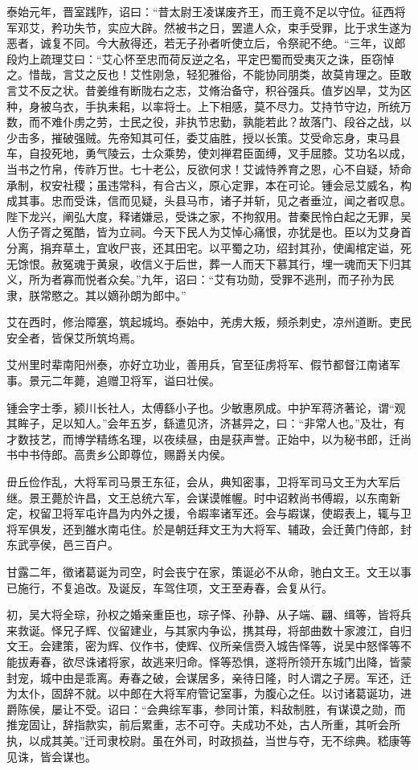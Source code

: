 \documentclass[12pt,UTF8]{ctexbook}
\begin{document}
泰始元年，晋室践阼，诏曰：“昔太尉王凌谋废齐王，而王竟不足以守位。征西将军邓艾，矜功失节，实应大辟。然被书之日，罢遣人众，束手受罪，比于求生遂为恶者，诚复不同。今大赦得还，若无子孙者听使立后，令祭祀不绝。“三年，议郎段灼上疏理艾曰：“艾心怀至忠而荷反逆之名，平定巴蜀而受夷灭之诛，臣窃悼之。惜哉，言艾之反也！艾性刚急，轻犯雅俗，不能协同朋类，故莫肯理之。臣敢言艾不反之状。昔姜维有断陇右之志，艾脩治备守，积谷强兵。值岁凶旱，艾为区种，身被乌衣，手执耒耜，以率将士。上下相感，莫不尽力。艾持节守边，所统万数，而不难仆虏之劳，士民之役，非执节忠勤，孰能若此？故落门、段谷之战，以少击多，摧破强贼。先帝知其可任，委艾庙胜，授以长策。艾受命忘身，束马县车，自投死地，勇气陵云，士众乘势，使刘禅君臣面缚，叉手屈膝。艾功名以成，当书之竹帛，传祚万世。七十老公，反欲何求！艾诚恃养育之恩，心不自疑，矫命承制，权安社稷；虽违常科，有合古义，原心定罪，本在可论。锺会忌艾威名，构成其事。忠而受诛，信而见疑，头县马巿，诸子并斩，见之者垂泣，闻之者叹息。陛下龙兴，阐弘大度，释诸嫌忌，受诛之家，不拘叙用。昔秦民怜白起之无罪，吴人伤子胥之冤酷，皆为立祠。今天下民人为艾悼心痛恨，亦犹是也。臣以为艾身首分离，捐弃草土，宜收尸丧，还其田宅。以平蜀之功，绍封其孙，使阖棺定谥，死无馀恨。赦冤魂于黄泉，收信义于后世，葬一人而天下慕其行，埋一魂而天下归其义，所为者寡而悦者众矣。”九年，诏曰：“艾有功勋，受罪不逃刑，而子孙为民隶，朕常愍之。其以嫡孙朗为郎中。”

艾在西时，修治障塞，筑起城坞。泰始中，羌虏大叛，频杀刺史，凉州道断。吏民安全者，皆保艾所筑坞焉。

艾州里时辈南阳州泰，亦好立功业，善用兵，官至征虏将军、假节都督江南诸军事。景元二年薨，追赠卫将军，谥曰壮侯。

锺会字士季，颍川长社人，太傅繇小子也。少敏惠夙成。中护军蒋济著论，谓“观其眸子，足以知人。”会年五岁，繇遣见济，济甚异之，曰：“非常人也。”及壮，有才数技艺，而博学精练名理，以夜续昼，由是获声誉。正始中，以为秘书郎，迁尚书中书侍郎。高贵乡公即尊位，赐爵关内侯。

毌丘俭作乱，大将军司马景王东征，会从，典知密事，卫将军司马文王为大军后继。景王薨於许昌，文王总统六军，会谋谟帷幄。时中诏敕尚书傅嘏，以东南新定，权留卫将军屯许昌为内外之援，令嘏率诸军还。会与嘏谋，使嘏表上，辄与卫将军俱发，还到雒水南屯住。於是朝廷拜文王为大将军、辅政，会迁黄门侍郎，封东武亭侯，邑三百户。

甘露二年，徵诸葛诞为司空，时会丧宁在家，策诞必不从命，驰白文王。文王以事已施行，不复追改。及诞反，车驾住项，文王至寿春，会复从行。

初，吴大将全琮，孙权之婚亲重臣也，琮子怿、孙静、从子端、翩、缉等，皆将兵来救诞。怿兄子辉、仪留建业，与其家内争讼，携其母，将部曲数十家渡江，自归文王。会建策，密为辉、仪作书，使辉、仪所亲信赍入城告怿等，说吴中怒怿等不能拔寿春，欲尽诛诸将家，故逃来归命。怿等恐惧，遂将所领开东城门出降，皆蒙封宠，城中由是乖离。寿春之破，会谋居多，亲待日隆，时人谓之子房。军还，迁为太仆，固辞不就。以中郎在大将军府管记室事，为腹心之任。以讨诸葛诞功，进爵陈侯，屡让不受。诏曰：“会典综军事，参同计策，料敌制胜，有谋谟之勋，而推宠固让，辞指款实，前后累重，志不可夺。夫成功不处，古人所重，其听会所执，以成其美。”迁司隶校尉。虽在外司，时政损益，当世与夺，无不综典。嵇康等见诛，皆会谋也。
\end{document}
